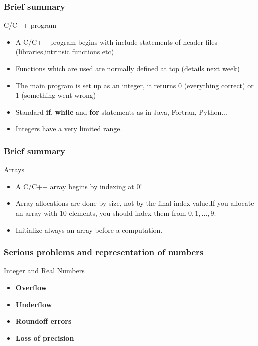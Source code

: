 \documentclass[compress]{beamer}
\begin{document}
\frame
{
  \frametitle{Brief summary}
  \begin{block}{C/C++ program}
\begin{itemize}
\item A C/C++ program begins with include statements of header files  (libraries,intrinsic functions etc)
       \item Functions which are used are normally defined at top (details next week)
\item The main program is set up as an integer, it returns 0 (everything correct) or 1  (something went wrong)
\item Standard {\bf if}, {\bf while} and {\bf for} statements as in Java, Fortran, Python...
\item Integers have a very limited range.
\end{itemize}
  \end{block}
}



\frame
{
  \frametitle{Brief summary}
  \begin{block}{Arrays}
\begin{itemize}
\item A C/C++ array begins by indexing at 0!
       \item Array allocations are done by size, not by the final index value.If you allocate an array with 10
elements, you should index them from $0,1,\dots, 9$.
\item Initialize always an array before a computation.
\end{itemize}
  \end{block}
}



\frame
{
  \frametitle{Serious problems and representation of numbers}
  \begin{block}{Integer and Real Numbers}
\begin{itemize}
\item {\bf Overflow }
\item {\bf Underflow }
\item {\bf Roundoff errors}
\item {\bf Loss of precision}
\end{itemize}
  \end{block}
}
\end{document}
